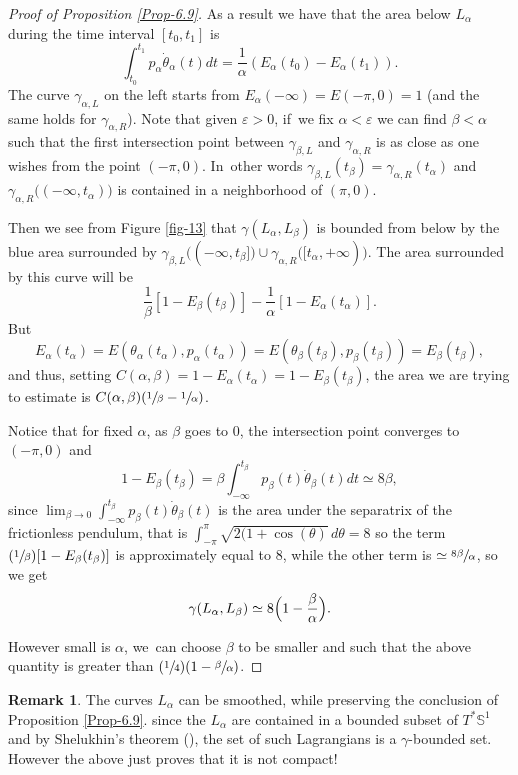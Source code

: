 \documentclass[10pt]{amsart}
\newcommand{\Psfrac}[2]{(\sfrac{#1}{#2})}
\theoremstyle{definition}
\newtheorem{rem}[thm]{Remark}
\newcommand{\bS}{\mathbb{S}}
\begin{document}
\begin{proof}[Proof of Proposition \ref{Prop-6.9}]
As a result we have that the area below $L_\alpha$ during the time interval $[t_0,t_1]$ is
\[
\int_{t_0}^{t_1} p_\alpha \dot \theta_\alpha(t) dt= \frac{1}{\alpha}(E_\alpha(t_0)-E_\alpha(t_1)).
\]
The curve $\gamma_{\alpha,L}$ on the left starts from $E_\alpha(-\infty)=E(-\pi,0)=1$ (and the same holds for $\gamma_{\alpha,R}$).
Note that given $ \varepsilon >0$, if~we fix $\alpha< \varepsilon $ we can find $\beta <\alpha $ such that the first intersection point between
$\gamma_{\beta,L}$ and $\gamma_{\alpha,R}$ is as close as one wishes from the point $(-\pi,0)$. In~other words $\gamma_{\beta,L}(t_\beta)=\gamma_{\alpha,R}(t_\alpha)$ and
$\gamma_{\alpha,R}\bigl((-\infty, t_\alpha)\bigr)$ is contained in a neighborhood of $(\pi,0)$.

Then we see from Figure \ref{fig-13} that $\gamma(L_\alpha, L_\beta)$ is bounded from below by the blue area surrounded by
$\gamma_{\beta,L}\bigl((-\infty, t_\beta]\bigr)\cup \gamma_{\alpha,R}\bigl([t_\alpha, +\infty)\bigr)$. The area surrounded by this curve will be
\[
\frac{1}{\beta}[1-E_\beta(t_\beta)]-\frac{1}{\alpha}[1-E_\alpha(t_\alpha)].
\]
But
\[
E_\alpha(t_\alpha)=E(\theta_\alpha(t_\alpha),p_\alpha(t_\alpha))=E(\theta_\beta(t_\beta),p_\beta(t_\beta))=E_\beta(t_\beta),
\]
and
thus, setting $C(\alpha,\beta)=1-E_\alpha(t_\alpha)=1-E_\beta(t_\beta)$,
the area we are trying to estimate is $C(\alpha, \beta) (\sfrac{1}{\beta}- \sfrac{1}{\alpha})$.

Notice that for fixed $\alpha$, as $\beta $ goes to $0$, the intersection point converges to $(-\pi,0)$ and
\[
1-E_\beta(t_\beta)=\beta\int_{-\infty}^{t_\beta}p_\beta(t)\dot \theta_\beta(t)dt\simeq 8\beta,
\]
since $\lim_{\beta\to 0}\int_{-\infty}^{t_\beta}p_\beta(t)\dot \theta_\beta(t)$ is the area under the separatrix of the frictionless pendulum, that is $\int_{-\pi}^\pi \sqrt{2(1+\cos(\theta)}\,d\theta =8$
so the term $\Psfrac{1}{\beta}[1-E_\beta(t_\beta)]$ is approximately equal to $8$, while the other term is $\simeq \sfrac{8\beta}{\alpha}$, so we get
\[
\gamma(L_\alpha, L_\beta)\simeq 8\Bigl(1- \frac{\beta}{\alpha}\Bigr).
\]

However small is $\alpha$, we~can choose $\beta$ to be smaller and such that the above quantity is greater than $\Psfrac14(1-\sfrac\beta\alpha)$.
\end{proof}

\begin{rem}
The curves $L_\alpha$ can be smoothed, while preserving the conclusion of Proposition \ref{Prop-6.9}. since the $L_\alpha$ are contained in a bounded subset of $T^*\bS^1$ and by Shelukhin's theorem (\cite{Shelukhin-Zoll}), the set of such Lagrangians is a $\gamma$\nobreakdash-bounded set. However the above just proves that it is not compact!
\end{rem}
\end{document}
